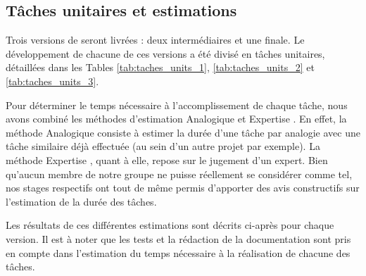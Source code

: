     \subsection{Tâches unitaires et estimations}
    \label{subsec:taches_unitaires}

        Trois versions de \glasir{} seront livrées : deux intermédiaires et une finale. Le développement de chacune de ces versions a été divisé en tâches unitaires, détaillées dans les {\sc Tables} \ref{tab:taches_units_1}, \ref{tab:taches_units_2} et \ref{tab:taches_units_3}.
        
        Pour déterminer le temps nécessaire à l'accomplissement de chaque tâche, nous avons combiné les méthodes d’estimation \og Analogique \fg{} et \og Expertise \fg{}. En effet, la méthode \og Analogique \fg{} consiste à estimer la durée d'une tâche par analogie avec une tâche similaire déjà effectuée (au sein d'un autre projet par exemple). La méthode \og Expertise \fg{}, quant à elle, repose sur le jugement d'un expert. Bien qu'aucun membre de notre groupe ne puisse réellement se considérer comme tel, nos stages respectifs ont tout de même permis d'apporter des avis constructifs sur l'estimation de la durée des tâches.
        
        Les résultats de ces différentes estimations sont décrits ci-après pour chaque version. Il est à noter que les tests et la rédaction de la documentation sont pris en compte dans l'estimation du temps nécessaire à la réalisation de chacune des tâches.
        

